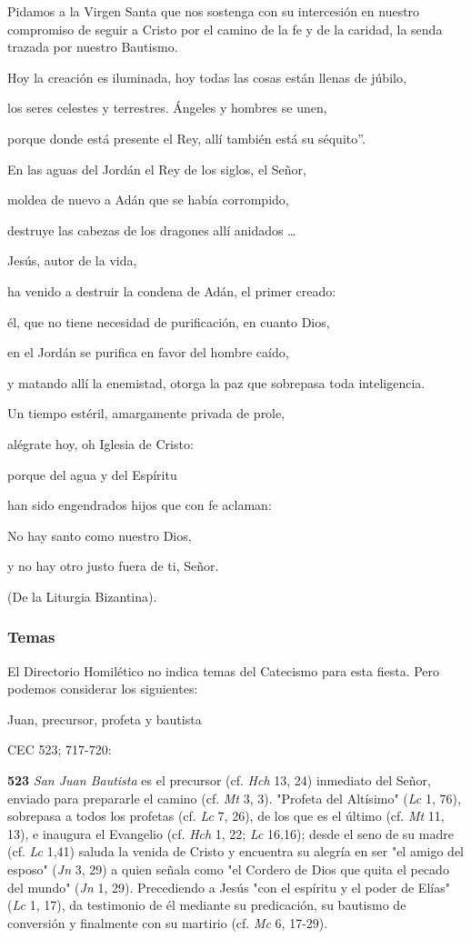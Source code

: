 \documentclass[]{article}
\begin{document}
Pidamos a la Virgen Santa que nos sostenga con su intercesión en nuestro
compromiso de seguir a Cristo por el camino de la fe y de la caridad, la
senda trazada por nuestro Bautismo.

\protect\hypertarget{_Ref448599213}{}{\protect\hypertarget{_Toc448662894}{}{}}

Hoy la creación es iluminada, hoy todas las cosas están llenas de
júbilo,

los seres celestes y terrestres. Ángeles y hombres se unen,

porque donde está presente el Rey, allí también está su séquito''.

En las aguas del Jordán el Rey de los siglos, el Señor,

moldea de nuevo a Adán que se había corrompido,

destruye las cabezas de los dragones allí anidados \ldots{}

Jesús, autor de la vida,

ha venido a destruir la condena de Adán, el primer creado:

él, que no tiene necesidad de purificación, en cuanto Dios,

en el Jordán se purifica en favor del hombre caído,

y matando allí la enemistad, otorga la paz que sobrepasa toda
inteligencia.

Un tiempo estéril, amargamente privada de prole,

alégrate hoy, oh Iglesia de Cristo:

porque del agua y del Espíritu

han sido engendrados hijos que con fe aclaman:

No hay santo como nuestro Dios,

y no hay otro justo fuera de ti, Señor.

(De la Liturgia Bizantina).

\subsubsection{Temas}\label{temas-12}

El Directorio Homilético no indica temas del Catecismo para esta fiesta.
Pero podemos considerar los siguientes:

Juan, precursor, profeta y bautista

CEC 523; 717-720:

\textbf{523} \emph{San Juan Bautista} es el precursor (cf. \emph{Hch}
13, 24) inmediato del Señor, enviado para prepararle el camino (cf.
\emph{Mt} 3, 3). "Profeta del Altísimo" (\emph{Lc} 1, 76), sobrepasa a
todos los profetas (cf. \emph{Lc} 7, 26), de los que es el último (cf.
\emph{Mt} 11, 13), e inaugura el Evangelio (cf. \emph{Hch} 1, 22;
\emph{Lc} 16,16); desde el seno de su madre (cf. \emph{Lc} 1,41) saluda
la venida de Cristo y encuentra su alegría en ser "el amigo del esposo"
(\emph{Jn} 3, 29) a quien señala como "el Cordero de Dios que quita el
pecado del mundo" (\emph{Jn} 1, 29). Precediendo a Jesús "con el
espíritu y el poder de Elías" (\emph{Lc} 1, 17), da testimonio de él
mediante su predicación, su bautismo de conversión y finalmente con su
martirio (cf. \emph{Mc} 6, 17-29).
\end{document}
